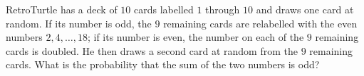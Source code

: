 RetroTurtle has a deck of $10$ cards labelled $1$ through $10$ and draws one card at random. If its number is odd, the $9$ remaining cards are relabelled with the even numbers $2,4,\dots,18$; if its number is even, the number on each of the $9$ remaining cards is doubled. He then draws a second card at random from the $9$ remaining cards. What is the probability that the sum of the two numbers is odd?
